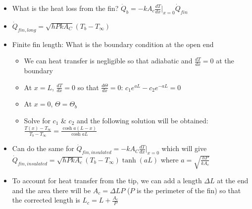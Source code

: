 \documentclass[12pt]{article}
\begin{document}
\begin{itemize}
\begin{itemize}
    \end{itemize}
    \item What is the heat loss from the fin? $\dot{Q}_b = -kA_c \frac{dT}{dx} |_{x = 0} \dot{Q}_{fin}$
    \item $\dot{Q}_{fin, long} = \sqrt{hPkA_C} (T_b - T_{\infty})$
    \item Finite fin length: What is the boundary condition at the open end \begin{itemize}
        \item We can heat transfer is negligible so that adiabatic and $\frac{dT}{dx} = 0$ at the boundary
        \item At $x = L$, $\frac{dT}{dx} = 0$ so that $\frac{d \Theta}{dx} = 0$: $c_1 e^{aL} - c_2 e^{-aL} = 0$ 
        \item At $x = 0$, $\Theta = \Theta_b$
        \item Solve for $c_1$ \& $c_2$ and the following solution will be obtained: $\frac{T(x) - T_{\infty}}{T_b - T_{\infty}} = \frac{\cosh a(L-x)}{\cosh aL}$ 
    \end{itemize}
    \item Can do the same for $\dot{Q}_{fin, insulated} = -k A_C \frac{dT}{dx} |_{x=0}$ which will give $\dot{Q}_{fin, insulated} = \sqrt{hPkA_c} (T_b - T_{\infty}) \tanh(aL)$ where $a = \sqrt{\frac{hP}{kA_c}}$
    \item To account for heat transfer from the tip, we can add a length $\Delta L$ at the end and the area there will be $A_c = \Delta L P$ ($P$ is the perimeter of the fin) so that the corrected length is $L_c = L + \frac{A_c}{P}$
\end{itemize}
\end{document}
